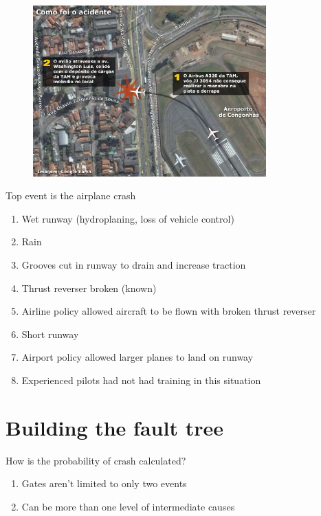 \documentclass[aspectratio=1610,pdftex,dvipsnames,compress,xcolor={dvipsnames}]{beamer}
\begin{document}
\begin{frame}{}
    \begin{figure}
        \centering
        \includegraphics[width=0.80\textwidth]{brazil_airport.jpg}
    \end{figure}
\end{frame}


\begin{frame}{Top event is the airplane crash}
    \begin{enumerate}[series=outerlist,topsep=0pt,itemsep=11pt,leftmargin=*,label=(\arabic*)]
        \item[]Wet runway (hydroplaning, loss of vehicle control)  
        \item[]Rain
        \item[]Grooves cut in runway to drain and increase traction  
        \item[]Thrust reverser broken (known)
        \item[]Airline policy allowed aircraft to be flown with broken thrust reverser  
        \item[]Short runway   
        \item[]Airport policy allowed larger planes to land on runway  
        \item[]Experienced pilots had not had training in this situation  
    \end{enumerate}
\end{frame}


\section{Building the fault tree}


\addtocounter{framenumber}{-1}
\begin{frame}{How is the probability of crash calculated?}
    \begin{enumerate}[series=outerlist,topsep=0pt,itemsep=21pt,leftmargin=*,label=(\arabic*)]
        \item[]Gates aren't limited to only two events  
        \item[]Can be more than one level of intermediate causes
    \end{enumerate}
\end{frame}
\end{document}

